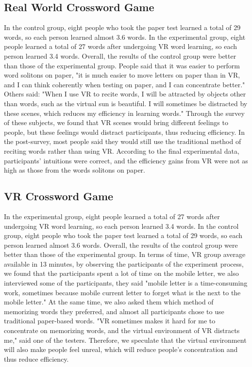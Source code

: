 \documentclass{vgtc}                          %
\begin{document}
\subsection{Real World Crossword Game}
In the control group, eight people who took the paper test learned a total of 29 words, so each person learned almost 3.6 words. In the experimental group, eight people learned a total of 27 words after undergoing VR word learning, so each person learned 3.4 words. Overall, the results of the control group were better than those of the experimental group. People said that it was easier to perform word solitons on paper, "it is much easier to move letters on paper than in VR, and I can think coherently when testing on paper, and I can concentrate better." Others said: "When I use VR to recite words, I will be attracted by objects other than words, such as the virtual sun is beautiful. I will sometimes be distracted by these scenes, which reduces my efficiency in learning words." Through the survey of these subjects, we found that VR scenes would bring different feelings to people, but these feelings would distract participants, thus reducing efficiency. In the post-survey, most people said they would still use the traditional method of reciting words rather than using VR. According to the final experimental data, participants' intuitions were correct, and the efficiency gains from VR were not as high as those from the words solitons on paper.
\subsection{VR Crossword Game}
In the experimental group, eight people learned a total of 27 words after undergoing VR word learning, so each person learned 3.4 words. In the control group, eight people who took the paper test learned a total of 29 words, so each person learned almost 3.6 words. Overall, the results of the control group were better than those of the experimental group. In terms of time, VR group average available in 13 minutes, by observing the participants of the experiment process, we found that the participants spent a lot of time on the mobile letter, we also interviewed some of the participants, they said "mobile letter is a time-consuming work, sometimes because mobile current letter to forget what is the next to the mobile letter." At the same time, we also asked them which method of memorizing words they preferred, and almost all participants chose to use traditional paper-based words. "VR sometimes makes it hard for me to concentrate on memorizing words, and the virtual environment of VR distracts me," said one of the testers. Therefore, we speculate that the virtual environment will also make people feel unreal, which will reduce people's concentration and thus reduce efficiency.
\end{document}
